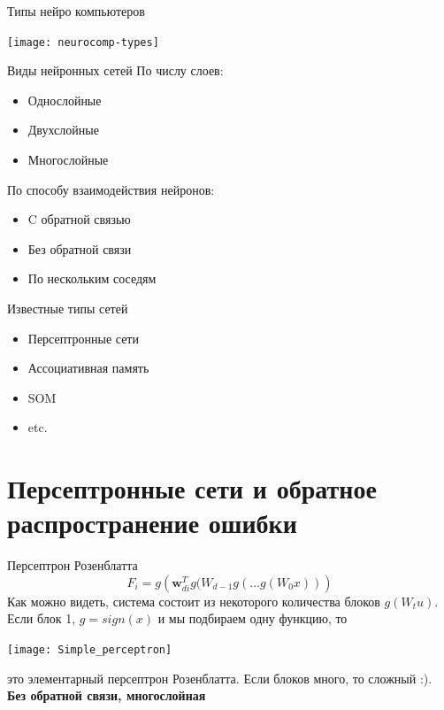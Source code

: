 \documentclass[14pt, fleqn, xcolor={dvipsnames, table}]{beamer}
\begin{document}
\begin{frame}{Типы нейро компьютеров}
\begin{center}
\texttt{[image: neurocomp-types]}
\end{center}
\end{frame}

\begin{frame}{Виды нейронных сетей}
По числу слоев:
\begin{itemize}
  \item Однослойные 
  \item Двухслойные
  \item Многослойные
\end{itemize}

По способу взаимодействия нейронов:
\begin{itemize}
  \item C обратной связью
  \item Без обратной связи
  \item По нескольким соседям
\end{itemize}
\end{frame}

\begin{frame}{Известные типы сетей}
\begin{itemize}
  \item Персептронные сети
  \item Ассоциативная память
  \item SOM
  \item etc.
\end{itemize}
\end{frame}

\section{Персептронные сети и обратное распространение ошибки}

\begin{frame}{Персептрон Розенблатта}
\small
$$
F_i = g\left(\mathbf{w}_{di}^T g(W_{d-1}g(\ldots g(W_{0}x))\right)
$$
Как можно видеть, система состоит из некоторого количества блоков $g(W_tu)$. Если блок 1, $g = sign(x)$ и мы подбираем одну функцию, то
\begin{center}
\texttt{[image: Simple\_perceptron]}
\end{center}
это элементарный персептрон Розенблатта. Если блоков много, то сложный :).\\
\textbf{Без обратной связи, многослойная}
\end{frame}
\end{document}
